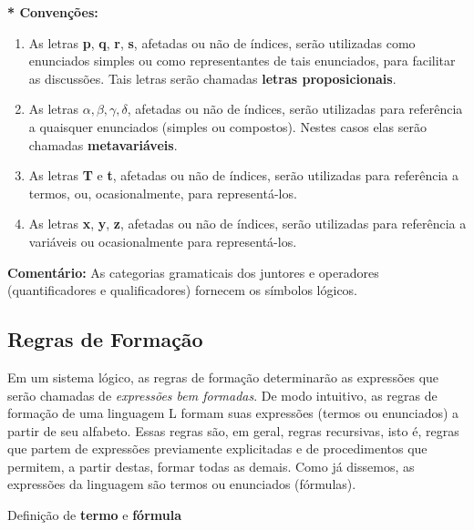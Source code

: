\begin{enumerate}[label=\arabic*)]
    \noindent \textbf{* Convenções:}
    \begin{enumerate}[label=\roman*)]
        \item As letras \textbf{p}, \textbf{q}, \textbf{r}, \textbf{s}, afetadas ou não de índices, serão utilizadas como enunciados simples ou como representantes de tais enunciados, para facilitar as discussões.
        Tais letras serão chamadas \textbf{letras proposicionais}.

        \item As letras $\alpha, \beta, \gamma, \delta$, afetadas ou não de índices, serão utilizadas para referência a quaisquer enunciados (simples ou compostos).
        Nestes casos elas serão chamadas \textbf{metavariáveis}.

        \item As letras \textbf{T} e \textbf{t}, afetadas ou não de índices, serão utilizadas para referência a termos, ou, ocasionalmente, para representá-los.

        \item As letras \textbf{x}, \textbf{y}, \textbf{z}, afetadas ou não de índices, serão utilizadas para referência a variáveis ou ocasionalmente para representá-los.
    \end{enumerate}

    \noindent \textbf{Comentário:} As categorias gramaticais dos juntores e operadores (quantificadores e qualificadores) fornecem os símbolos lógicos.
\end{enumerate}


\subsection{Regras de Formação}
\setcounter{exemplo}{0}

Em um sistema lógico, as regras de formação determinarão as expressões que serão chamadas de \emph{expressões bem formadas}.
De modo intuitivo, as regras de formação de uma linguagem L formam suas expressões (termos ou enunciados) a partir de seu alfabeto.
Essas regras são, em geral, regras recursivas, isto é, regras que partem de expressões previamente explicitadas e de procedimentos que permitem, a partir destas, formar todas as demais.
Como já dissemos, as expressões da linguagem são termos ou enunciados (fórmulas).

\bigskip
\noindent Definição de \textbf{termo} e \textbf{fórmula}


